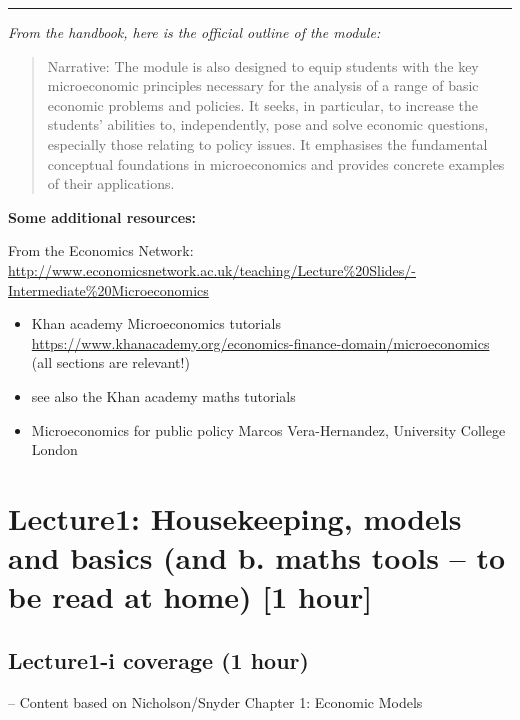 \documentclass[]{article}
\begin{document}
\begin{center}\rule{0.5\linewidth}{\linethickness}\end{center}

\emph{From the handbook, here is the official outline of the module:}

\begin{quote}
Narrative: The module is also designed to equip students with the key microeconomic principles necessary for the analysis of a range of basic economic problems and policies. It seeks, in particular, to increase the students' abilities to, independently, pose and solve economic questions, especially those relating to policy issues. It emphasises the fundamental conceptual foundations in microeconomics and provides concrete examples of their applications.
\end{quote}

\textbf{Some additional resources:}

From the Economics Network: \url{http://www.economicsnetwork.ac.uk/teaching/Lecture\%20Slides/-Intermediate\%20Microeconomics}

\begin{itemize}
\item
  Khan academy Microeconomics tutorials
  \url{https://www.khanacademy.org/economics-finance-domain/microeconomics} (all sections are relevant!)
\item
  see also the Khan academy maths tutorials
\item
  Microeconomics for public policy Marcos Vera-Hernandez, University College London
\end{itemize}

\hypertarget{lecture1-housekeeping-models-and-basics-and-b.-maths-tools-to-be-read-at-home-1-hour}{%
\section{Lecture1: Housekeeping, models and basics (and b. maths tools -- to be read at home) {[}1 hour{]}}\label{lecture1-housekeeping-models-and-basics-and-b.-maths-tools-to-be-read-at-home-1-hour}}

\hypertarget{lecture1-i-coverage-1-hour}{%
\subsection{Lecture1-i coverage (1 hour)}\label{lecture1-i-coverage-1-hour}}

-- Content based on Nicholson/Snyder Chapter 1: Economic Models
\end{document}
